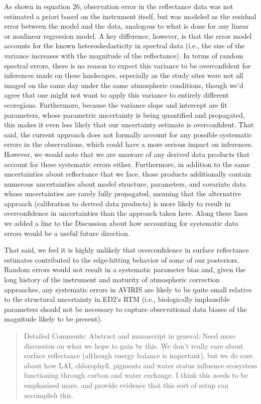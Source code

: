 As shown in equation 26, observation error in the reflectance data was not estimated a priori based on the instrument itself, but was modeled as the residual error between the model and the data, analogous to what is done for any linear or nonlinear regression model. A key difference, however, is that the error model accounts for the known heteroskedasticity in spectral data (i.e., the size of the variance increases with the magnitude of the reflectance). In terms of random spectral errors, there is no reason to expect this variance to be overconfident for inferences made on these landscapes, especially as the study sites were not all imaged on the same day under the same atmospheric conditions, though we’d agree that one might not want to apply this variance to entirely different ecoregions. Furthermore, because the variance slope and intercept are fit parameters, whose parametric uncertainty is being quantified and propagated, this makes it even less likely that our uncertainty estimate is overconfident. That said, the current approach does not formally account for any possible systematic errors in the observations, which could have a more serious impact on inferences. However, we would note that we are unaware of any derived data products that account for these systematic errors either. Furthermore, in addition to the same uncertainties about reflectance that we face, those products additionally contain numerous uncertainties about model structure, parameters, and covariate data whose uncertainties are rarely fully propagated, meaning that the alternative approach (calibration to derived data products) is more likely to result in overconfidence in uncertainties than the approach taken here. Along these lines we added a line to the Discussion about how accounting for systematic data errors would be a useful future direction.

That said, we feel it is highly unlikely that overconfidence in surface reflectance estimates contributed to the edge-hitting behavior of some of our posteriors. Random errors would not result in a systematic parameter bias and, given the long history of the instrument and maturity of atmospheric correction approaches, any systematic errors in AVIRIS are likely to be quite small relative to the structural uncertainty in ED2’s RTM (i.e., biologically implausible parameters should not be necessary to capture observational data biases of the magnitude likely to be present).

\begin{quote}
  Detailed Comments:
  Abstract and manuscript in general: Need more discussion on what we hope to gain by this. We don’t really care about surface reflectance (although energy balance is important), but we do care about how LAI, chlorophyll, pigments and water status influence ecosystem functioning through carbon and water exchange. I think this needs to be emphasized more, and provide evidence that this sort of setup can accomplish this.
\end{quote}

